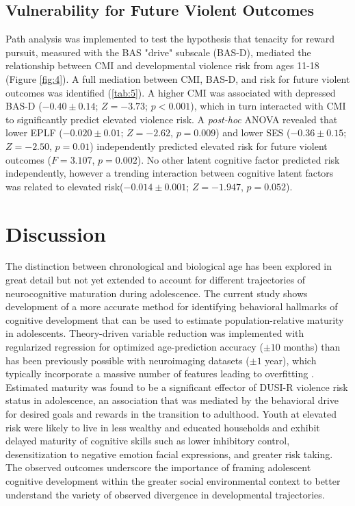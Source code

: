 \documentclass[utf8]{frontiersSCNS} %
\begin{document}
\subsection{Vulnerability for Future Violent Outcomes} Path analysis was implemented to test the hypothesis that tenacity for reward pursuit, measured with the BAS "drive" subscale (BAS-D), mediated the relationship between CMI and developmental violence risk from ages 11-18 (Figure \ref{fig:4}). A full mediation between CMI, BAS-D, and risk for future violent outcomes was identified (\ref{tab:5}). A higher CMI was associated with depressed BAS-D ($-0.40\pm0.14$; $Z=-3.73$; $p<0.001$), which in turn interacted with CMI to significantly predict elevated violence risk. A \textit{post-hoc} ANOVA revealed that lower EPLF ($-0.020\pm0.01$; $Z=-2.62$, $p=0.009$) and lower SES ($-0.36\pm0.15$; $Z=-2.50$, $p=0.01$) independently predicted elevated risk for future violent outcomes ($F=3.107$, $p=0.002$). No other latent cognitive factor predicted risk independently, however a trending interaction between cognitive latent factors was related to elevated risk($-0.014\pm0.001$; $Z=-1.947$,  $p=0.052$).
\\
\section{Discussion} The distinction between chronological and biological age has been explored in great detail but not yet extended to account for different trajectories of neurocognitive maturation during adolescence. The current study shows development of a more accurate method for identifying behavioral hallmarks of cognitive development that can be used to estimate population-relative maturity in adolescents. Theory-driven variable reduction was implemented with regularized regression for optimized age-prediction accuracy ($\pm 10$ months) than has been previously possible with neuroimaging datasets ($\pm1$ year), which typically incorporate a massive number of features leading to overfitting \citep{cole2017predicting, franke2012brain}. Estimated maturity was found to be a significant effector of DUSI-R violence risk status in adolescence, an association that was mediated by the behavioral drive for desired goals and rewards in the transition to adulthood. Youth at elevated risk were likely to live in less wealthy and educated households and exhibit delayed maturity of cognitive skills such as lower inhibitory control, desensitization to negative emotion facial expressions, and greater risk taking. The observed outcomes underscore the importance of framing adolescent cognitive development within the greater social environmental context to better understand the variety of observed divergence in developmental trajectories.
\vspace{4pt}
\end{document}
